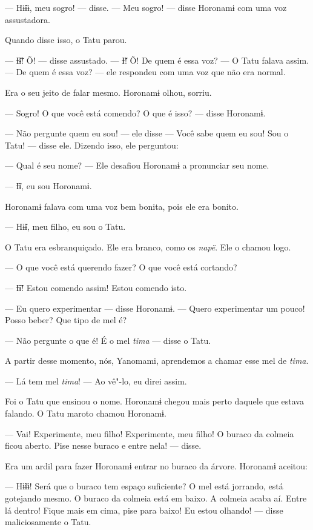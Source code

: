 --- Hɨ̃ɨɨ, meu sogro! --- disse. --- Meu sogro! --- disse Horonamɨ com
uma voz assustadora. 

Quando disse isso, o Tatu parou. 

--- Ɨ̃ɨ̃! Õ! --- disse assustado. --- Ɨ̃! Õ! De quem é essa voz? --- O Tatu
falava assim. --- De quem é essa voz? --- ele respondeu com uma voz que
não era normal. 

Era o seu jeito de falar mesmo. Horonamɨ olhou, sorriu.

--- Sogro! O que você está comendo? O que é isso? --- disse Horonamɨ. 

--- Não pergunte quem eu sou! --- ele disse --- Você sabe quem eu sou!
Sou o Tatu! --- disse ele. Dizendo isso, ele perguntou: 

--- Qual é seu nome? --- Ele desafiou Horonamɨ a pronunciar seu nome. 

--- Ɨ̃ɨ, eu sou Horonamɨ. 

Horonamɨ falava com uma voz bem bonita, pois ele era bonito. 

--- Hɨ̃ɨ, meu filho, eu sou o Tatu. 

O Tatu era esbranquiçado. Ele era branco, como os \emph{napë}. Ele o
chamou logo. 

--- O que você está querendo fazer? O que você está cortando? 

--- Ɨ̃ɨ̃! Estou comendo assim! Estou comendo isto.

--- Eu quero experimentar --- disse Horonamɨ. --- Quero experimentar um
pouco! Posso beber? Que tipo de mel é? 

--- Não pergunte o que é! É o mel \emph{tima} --- disse o Tatu. 

A partir desse momento, nós, Yanomami, aprendemos a chamar esse mel
de \emph{tima}. 

--- Lá tem mel \emph{tima}! --- Ao vê"-lo, eu direi assim. 

Foi o Tatu que ensinou o nome. Horonamɨ chegou mais perto daquele que
estava falando. O Tatu maroto chamou Horonamɨ. 

--- Vai! Experimente, meu filho! Experimente, meu filho! O buraco da
colmeia ficou aberto. Pise nesse buraco e entre nela! --- disse. 

Era um ardil para fazer Horonamɨ entrar no buraco da árvore. Horonamɨ
aceitou: 

--- Hɨ̃ɨɨ! Será que o buraco tem espaço suficiente? O mel está jorrando,
está gotejando mesmo. O buraco da colmeia está em baixo. A colmeia acaba
aí. Entre lá dentro! Fique mais em cima, pise para baixo! Eu estou
olhando! --- disse maliciosamente o Tatu. 

